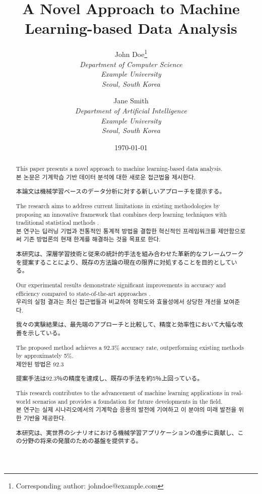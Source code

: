 \documentclass[12pt,a4paper]{article}
\title{A Novel Approach to Machine Learning-based Data Analysis}
\author{
    John Doe\thanks{Corresponding author: johndoe@example.com} \\
    \textit{Department of Computer Science} \\
    \textit{Example University} \\
    \textit{Seoul, South Korea}
    \and
    Jane Smith \\
    \textit{Department of Artificial Intelligence} \\
    \textit{Example University} \\
    \textit{Seoul, South Korea}
}
\date{\today}
\begin{document}
\maketitle

\begin{abstract}
This paper presents a novel approach to machine learning-based data analysis. \\
본 논문은 기계학습 기반 데이터 분석에 대한 새로운 접근법을 제시한다. \\
\begin{CJK}{UTF8}{min}
本論文は機械学習ベースのデータ分析に対する新しいアプローチを提示する。
\end{CJK}

The research aims to address current limitations in existing methodologies by proposing an innovative framework that combines deep learning techniques with traditional statistical methods \cite{lecun2015deep}. \\
본 연구는 딥러닝 기법과 전통적인 통계적 방법을 결합한 혁신적인 프레임워크를 제안함으로써 기존 방법론의 현재 한계를 해결하는 것을 목표로 한다. \\
\begin{CJK}{UTF8}{min}
本研究は、深層学習技術と従来の統計的手法を組み合わせた革新的なフレームワークを提案することにより、既存の方法論の現在の限界に対処することを目的としている。
\end{CJK}

Our experimental results demonstrate significant improvements in accuracy and efficiency compared to state-of-the-art approaches \cite{goodfellow2016deep}. \\
우리의 실험 결과는 최신 접근법들과 비교하여 정확도와 효율성에서 상당한 개선을 보여준다. \\
\begin{CJK}{UTF8}{min}
我々の実験結果は、最先端のアプローチと比較して、精度と効率性において大幅な改善を示している。
\end{CJK}

The proposed method achieves a 92.3\% accuracy rate, outperforming existing methods by approximately 5\%. \\
제안된 방법은 92.3%
\begin{CJK}{UTF8}{min}
提案手法は92.3％の精度を達成し、既存の手法を約5％上回っている。
\end{CJK}

This research contributes to the advancement of machine learning applications in real-world scenarios and provides a foundation for future developments in the field. \\
본 연구는 실제 시나리오에서의 기계학습 응용의 발전에 기여하고 이 분야의 미래 발전을 위한 기반을 제공한다. \\
\begin{CJK}{UTF8}{min}
本研究は、実世界のシナリオにおける機械学習アプリケーションの進歩に貢献し、この分野の将来の発展のための基盤を提供する。
\end{CJK}
\end{abstract}
\end{document}
